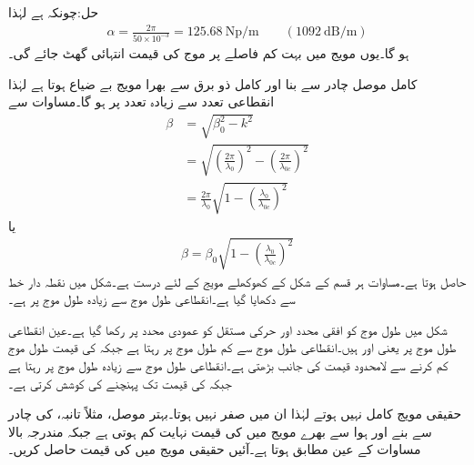 حل:چونکہ  ہے لہٰذا
\begin{align*}
\alpha=\frac{2\pi}{50\times 10^{-3}}=\SI{125.68}{\neper/\meter} \quad \quad  \left(\SI{1092}{\deci\bel\per\meter}\right)
\end{align*}
ہو گا۔یوں مویج میں بہت کم فاصلے پر موج کی قیمت انتہائی گھٹ جائے گی۔ 

کامل موصل چادر سے بنا اور کامل ذو برق سے بھرا  مویج بے ضیاع ہوتا ہے لہٰذا انقطاعی تعدد سے زیادہ  تعدد پر  ہو گا۔مساوات  سے 
\begin{align*}
\beta&=\sqrt{\beta_0^2-k^2}\\
&=\sqrt{\left(\frac{2\pi}{\lambda_0}\right)^2-\left(\frac{2\pi}{\lambda_{0c}}\right)^2}\\
&=\frac{2\pi}{\lambda_0}\sqrt{1-\left(\frac{\lambda_0}{\lambda_{0c}}\right)^2}
\end{align*}
یا
\begin{align}\label{مساوات_مویج_زاویائی_مستقل_عمومی_مساوات}
\beta=\beta_0\sqrt{1-\left(\frac{\lambda_0}{\lambda_{0c}}\right)^2}
\end{align}
حاصل ہوتا ہے۔مساوات  ہر قسم کے  شکل کے کھوکھلے مویج کے لئے درست ہے۔شکل  میں نقطہ دار خط سے  دکھایا گیا ہے۔انقطاعی طول موج سے زیادہ طول موج پر  ہے۔

شکل  میں طول موج کو افقی محدد اور حرکی مستقل کو عمودی محدد پر رکھا گیا ہے۔عین انقطاعی طول موج  پر  یعنی  اور  ہیں۔انقطاعی طول موج سے کم طول موج پر  رہتا ہے جبکہ  کی قیمت طول موج کم کرنے سے لامحدود قیمت کی جانب بڑھتی ہے۔انقطاعی طول موج سے زیادہ طول موج پر  رہتا ہے جبکہ  کی قیمت  تک پہنچنے کی کوشش کرتی ہے۔

حقیقی مویج کامل نہیں ہوتے لہٰذا ان میں  صفر نہیں ہوتا۔بہتر موصل، مثلاً تانبہ، کی چادر سے بنے اور ہوا سے بھرے مویج میں  کی قیمت نہایت کم ہوتی ہے جبکہ  مندرجہ بالا مساوات کے عین مطابق ہوتا ہے۔آئیں حقیقی مویج میں  کی قیمت حاصل کریں۔

